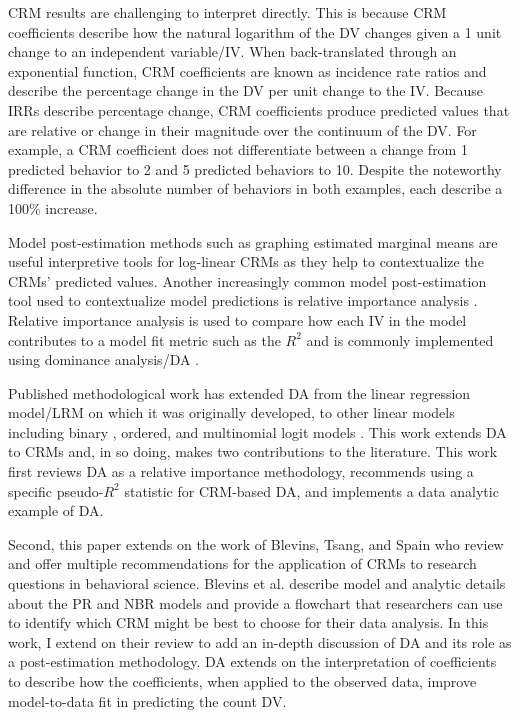 \documentclass[man]{apa7}
\begin{document}
	CRM results are challenging to interpret directly.
	This is because CRM coefficients describe how the natural logarithm of the DV changes given a 1 unit change to an independent variable/IV. 
	When back-translated through an exponential function, CRM coefficients are known as incidence rate ratios and describe the percentage change in the DV per unit change to the IV.
	Because IRRs describe percentage change, CRM coefficients produce predicted values that are relative or change in their magnitude over the continuum of the DV.
	For example, a CRM coefficient does not differentiate between a change from 1 predicted behavior to 2 and 5 predicted behaviors to 10. 
	Despite the noteworthy difference in the absolute number of behaviors in both examples, each describe a 100\% increase.
		
	Model post-estimation methods such as graphing estimated marginal means are useful interpretive tools for log-linear CRMs as they help to contextualize the CRMs' predicted values.
	Another increasingly common model post-estimation tool used to contextualize model predictions is relative importance analysis \parencite{tonidandel2011relative}. 
	Relative importance analysis is used to compare how each IV in the model contributes to a model fit metric such as the $R^2$ and is commonly implemented using dominance analysis/DA \parencite{azen2003dominance}.
	
	Published methodological work has extended DA from the linear regression model/LRM on which it was originally developed, to other linear models including binary \parencite{azen2009using}, ordered, and multinomial logit models \parencite{luchman2014relative}.	
	This work extends DA to CRMs and, in so doing, makes two contributions to the literature.
	This work first reviews DA as a relative importance methodology, recommends using a specific pseudo-$R^2$ statistic for CRM-based DA, and implements a data analytic example of DA.

	Second, this paper extends on the work of Blevins, Tsang, and Spain \parencite*{blevins2015count} who review and offer multiple recommendations for the application of CRMs to research questions in behavioral science. 
	Blevins et al. describe model and analytic details about the PR and NBR models and provide a flowchart that researchers can use to identify which CRM might be best to choose for their data analysis.
	In this work, I extend on their review to add an in-depth discussion of DA and its role as a post-estimation methodology.
	DA extends on the interpretation of coefficients to describe how the coefficients, when applied to the observed data, improve model-to-data fit in predicting the count DV.
\end{document}

